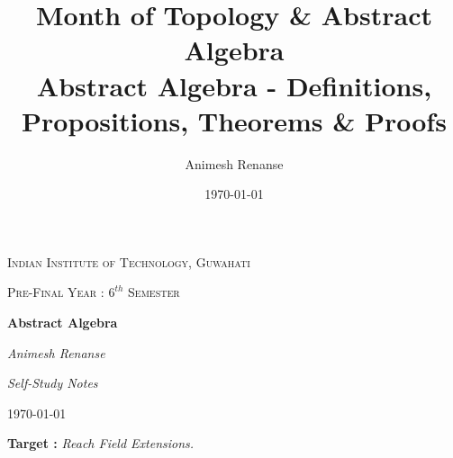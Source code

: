 \documentclass{article}
\title{Month of Topology \& Abstract Algebra\\
	\large Abstract Algebra - Definitions, Propositions, Theorems \& Proofs}
\author{Animesh Renanse}
\date{\today}
\theoremstyle{definition}
\newtheorem{definition}{$\boxed{\star}$ Definition}
\theoremstyle{remark}
\theoremstyle{definition}
\theoremstyle{definition}
\newtheorem{proposition}{$\checkmark$ Proposition}
\theoremstyle{definition}
\theoremstyle{proof}
\begin{document}
	
	\begin{titlepage}
		{\scshape\LARGE Indian Institute of Technology, Guwahati \par}
		\vspace{1cm}
		{\scshape\Large Pre-Final Year : $ 6^{th} $ Semester\par}
		\vspace{1.5cm}
		{\Huge\bfseries Abstract Algebra\par}
		\vspace{2cm}
		{\Large\itshape Animesh Renanse\par}
		\vfill
		{\large \itshape Self-Study Notes\par}
		\vfill
		
		{\large \today\par}
	\end{titlepage}
\tableofcontents
\newpage
	\textbf{Target : }\textit{Reach Field Extensions.}
\end{document}
